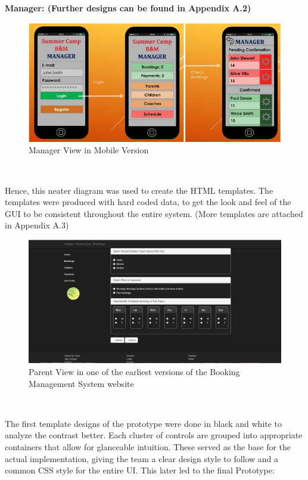 \documentclass{l3proj}
\begin{document}
\\
\\ \textbf{Manager: (Further designs can be found in Appendix A.2)}
\\ 
{
\begin{figure}[h]
\caption{Manager View in Mobile Version}
\centering
\includegraphics[scale=0.60]{diagramdraft2Manager.jpg}
\end{figure}
}
\\
\par 
Hence, this neater diagram was used to create the HTML templates. The templates were produced with hard coded data, to get the look and feel of the GUI to be consistent throughout the entire system. (More templates are attached in Appendix A.3)
\\ 
{
\begin{figure}[h]
\caption{Parent View in one of the earliest versions of the Booking Management System website}
\centering
\includegraphics[scale=0.35]{parent_template.jpg}
\end{figure}
}
\\
\par 
The first template designs of the prototype were done in black and white to analyze the contrast better. Each cluster of controls are grouped into appropriate containers that allow for glanceable intuition. These served as the base for the actual implementation, giving the team a clear design style to follow and a common CSS style for the entire UI. This later led to the final Prototype:
\end{document}
